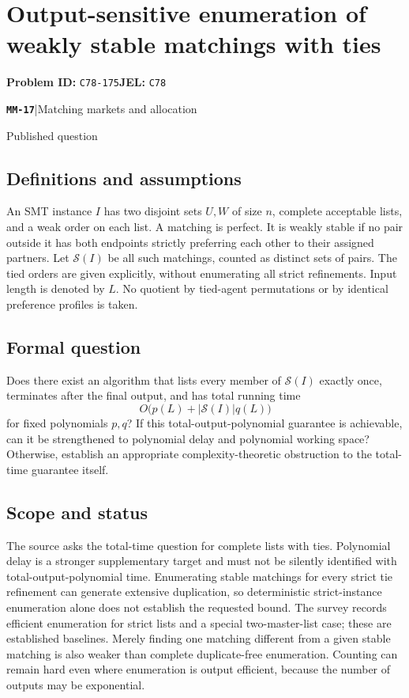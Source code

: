 \documentclass[11pt,a4paper]{article}
\newcommand{\entrymeta}[3]{{\sffamily\small\color{muted}\textbf{\texttt{#1}}\quad|\quad #2\par #3\par}}
\begin{document}
\section*{Output-sensitive enumeration of weakly stable matchings with ties}
\textbf{Problem ID:} \texttt{C78-175}\quad \textbf{JEL:} \texttt{C78}\par
\label{problem:OP-0558}
\label{beyond:MM-17}
\entrymeta{MM-17}{Matching markets and allocation}{Published question}
\subsection*{Definitions and assumptions}
An SMT instance $I$ has two disjoint sets $U,W$ of size $n$, complete acceptable lists, and a weak order on each list. A matching is perfect. It is weakly stable if no pair outside it has both endpoints strictly preferring each other to their assigned partners. Let $\mathcal S(I)$ be all such matchings, counted as distinct sets of pairs. The tied orders are given explicitly, without enumerating all strict refinements. Input length is denoted by $L$. No quotient by tied-agent permutations or by identical preference profiles is taken.
\subsection*{Formal question}
Does there exist an algorithm that lists every member of $\mathcal S(I)$ exactly once, terminates after the final output, and has total running time
\[
 O\bigl(p(L)+|\mathcal S(I)|q(L)\bigr)
\]
for fixed polynomials $p,q$? If this total-output-polynomial guarantee is achievable, can it be strengthened to polynomial delay and polynomial working space? Otherwise, establish an appropriate complexity-theoretic obstruction to the total-time guarantee itself.
\subsection*{Scope and status}
The source asks the total-time question for complete lists with ties. Polynomial delay is a stronger supplementary target and must not be silently identified with total-output-polynomial time. Enumerating stable matchings for every strict tie refinement can generate extensive duplication, so deterministic strict-instance enumeration alone does not establish the requested bound. The survey records efficient enumeration for strict lists and a special two-master-list case; these are established baselines. Merely finding one matching different from a given stable matching is also weaker than complete duplicate-free enumeration. Counting can remain hard even where enumeration is output efficient, because the number of outputs may be exponential.
\end{document}
